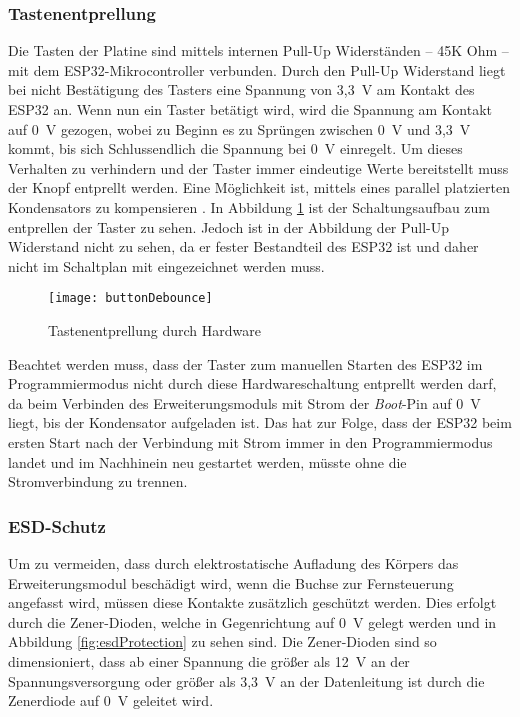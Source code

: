 \subsubsection{Tastenentprellung}
Die Tasten der Platine sind mittels internen Pull-Up Widerständen -- 45K Ohm -- mit dem ESP32-Mikrocontroller verbunden. Durch den Pull-Up Widerstand liegt bei nicht Bestätigung des Tasters eine Spannung von 3,3~V am Kontakt des ESP32 an. Wenn nun ein Taster betätigt wird, wird die Spannung am Kontakt auf 0~V gezogen, wobei zu Beginn es zu Sprüngen zwischen 0~V und 3,3~V kommt, bis sich Schlussendlich die Spannung bei 0~V einregelt. Um dieses Verhalten zu verhindern und der Taster immer eindeutige Werte bereitstellt muss der Knopf entprellt werden. Eine Möglichkeit ist, mittels eines parallel platzierten Kondensators zu kompensieren \cite{debounceButton}. In Abbildung \ref{fig:buttonDebounce} ist der Schaltungsaufbau zum entprellen der Taster zu sehen. Jedoch ist in der Abbildung der Pull-Up Widerstand nicht zu sehen, da er fester Bestandteil des ESP32 ist und daher nicht im Schaltplan mit eingezeichnet werden muss.

\begin{figure}[h]
    \centering
    \texttt{[image: buttonDebounce]}
    \caption{Tastenentprellung durch Hardware}
    \label{fig:buttonDebounce}
\end{figure}

Beachtet werden muss, dass der Taster zum manuellen Starten des ESP32 im Programmiermodus nicht durch diese Hardwareschaltung entprellt werden darf, da beim Verbinden des Erweiterungsmoduls mit Strom der \textit{Boot}-Pin auf 0~V liegt, bis der Kondensator aufgeladen ist. Das hat zur Folge, dass der ESP32 beim ersten Start nach der Verbindung mit Strom immer in den Programmiermodus landet und im Nachhinein neu gestartet werden, müsste ohne die Stromverbindung zu trennen.

\subsubsection{\acf{ESD}-Schutz}
Um zu vermeiden, dass durch elektrostatische Aufladung des Körpers das Erweiterungsmodul beschädigt wird, wenn die Buchse zur Fernsteuerung angefasst wird, müssen diese Kontakte zusätzlich geschützt werden. Dies erfolgt durch die Zener-Dioden, welche in Gegenrichtung auf 0~V gelegt werden und in Abbildung \ref{fig:esdProtection} zu sehen sind. Die Zener-Dioden sind so dimensioniert, dass ab einer Spannung die größer als 12~V an der Spannungsversorgung oder größer als 3,3~V an der Datenleitung ist durch die Zenerdiode auf 0~V geleitet wird.

